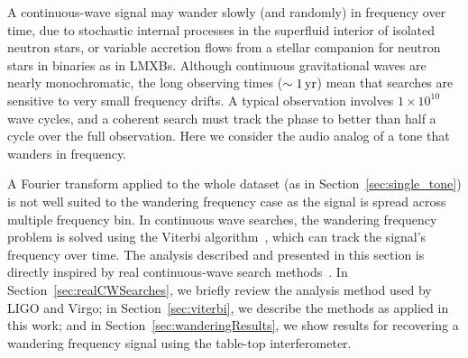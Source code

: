 \documentclass[paper-main.tex]{subfiles}
\begin{document}
A continuous-wave signal may wander slowly (and randomly) in frequency over time, due to stochastic internal processes in the superfluid interior of isolated neutron stars, or variable accretion flows from a stellar companion for neutron stars in binaries as in LMXBs.
Although continuous gravitational waves are nearly monochromatic, the long observing times ($\sim 1\,{\rm yr}$) mean that searches are sensitive to very small frequency drifts. 
A typical observation involves $1 \times 10^{10}$ wave cycles, and a coherent search must track the phase to better than half a cycle over the full observation. 
Here we consider the audio analog of a tone that wanders in frequency. 




A Fourier transform applied to the whole dataset (as in Section~\ref{sec:single_tone}) is not well suited to the wandering frequency case as the signal is spread across multiple frequency bin. 
In continuous wave searches, the wandering frequency problem is solved using the Viterbi algorithm~\cite{Viterbi:1967}, which can track the signal's frequency over time.
The analysis described and presented in this section is directly inspired by real continuous-wave search methods~\cite{SuvorovaEtAl:2017}. 
In Section~\ref{sec:realCWSearches}, we briefly review the analysis method used by LIGO and Virgo; in Section~\ref{sec:viterbi}, we describe the methods as applied in this work; and in Section~\ref{sec:wanderingResults}, we show results for recovering a wandering frequency signal using the table-top interferometer. 
\end{document}
